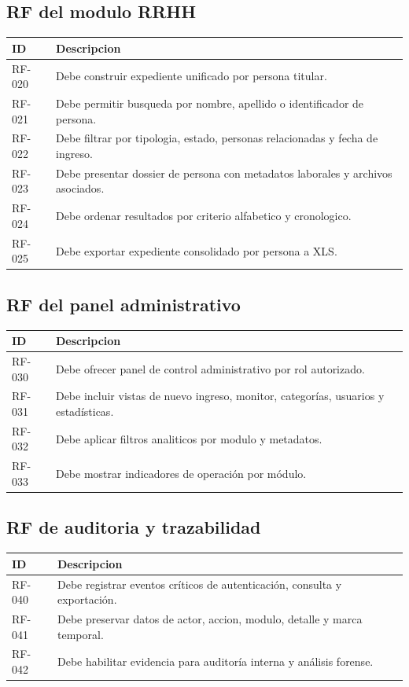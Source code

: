 \subsection{RF del modulo RRHH}
\begin{longtable}{p{} p{}}
\toprule
\textbf{ID} & \textbf{Descripcion} \\
\midrule
RF-020 & Debe construir expediente unificado por persona titular. \\
RF-021 & Debe permitir busqueda por nombre, apellido o identificador de persona. \\
RF-022 & Debe filtrar por tipologia, estado, personas relacionadas y fecha de ingreso. \\
RF-023 & Debe presentar dossier de persona con metadatos laborales y archivos asociados. \\
RF-024 & Debe ordenar resultados por criterio alfabetico y cronologico. \\
RF-025 & Debe exportar expediente consolidado por persona a XLS. \\
\bottomrule
\end{longtable}

\subsection{RF del panel administrativo}
\begin{longtable}{p{} p{}}
\toprule
\textbf{ID} & \textbf{Descripcion} \\
\midrule
RF-030 & Debe ofrecer panel de control administrativo por rol autorizado. \\
RF-031 & Debe incluir vistas de nuevo ingreso, monitor, categorías, usuarios y estadísticas. \\
RF-032 & Debe aplicar filtros analiticos por modulo y metadatos. \\
RF-033 & Debe mostrar indicadores de operación por módulo. \\
\bottomrule
\end{longtable}

\subsection{RF de auditoria y trazabilidad}
\begin{longtable}{p{} p{}}
\toprule
\textbf{ID} & \textbf{Descripcion} \\
\midrule
RF-040 & Debe registrar eventos críticos de autenticación, consulta y exportación. \\
RF-041 & Debe preservar datos de actor, accion, modulo, detalle y marca temporal. \\
RF-042 & Debe habilitar evidencia para auditoría interna y análisis forense. \\
\bottomrule
\end{longtable}

